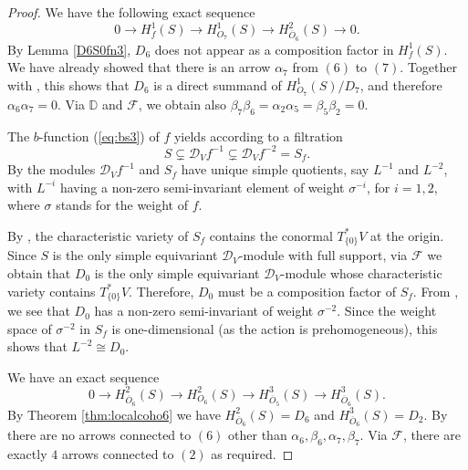 \documentclass[11pt,reqno]{amsart}
\renewcommand{\a}{\alpha}
\renewcommand{\b}{\beta}
\newcommand{\D}{\mathcal{D}}
\newcommand{\mc}[1]{\mathcal{#1}}
\newcommand{\ol}[1]{\overline{#1}}
\numberwithin{equation}{section}
\begin{document}
\begin{proof}
We have the following exact sequence
\begin{equation}\label{eq:O7}
0 \to H^1_f(S) \to H^1_{O_7}(S) \to H^2_{\ol{O}_6}(S) \to 0.
\end{equation}
By Lemma \ref{D6S0fn3}, $D_6$ does not appear as a composition factor in $H^1_f(S)$. We have already showed that there is an arrow $\a_7$ from $(6)$ to $(7)$. Together with \cite[Lemma 3.11]{lHorincz2019categories}, this shows that $D_6$ is a direct summand of $H^1_{O_7}(S)/D_7$, and therefore $\a_6 \a_7 = 0$. Via $\mathbb{D}$ and $\mc{F}$, we obtain also $\b_7 \b_6 = \a_2 \a_5 = \b_5 \b_2=0$.

The $b$-function (\ref{eq:bs3}) of $f$ yields according to \cite[Proposition 4.9]{lHorincz2019categories} a filtration
\[S \subsetneq \D_V f^{-1} \subsetneq \D_V f^{-2} = S_f.\]
By \cite[Lemma 2.8]{lHorincz2019categories} the modules $\D_V f^{-1}$ and $S_f$ have unique simple quotients, say $L^{-1}$ and $L^{-2}$, with $L^{-i}$ having a non-zero semi-invariant element of weight $\sigma^{-i}$, for $i=1,2$, where $\sigma$ stands for the weight of $f$. 

By \cite[Proposition 4.6]{microlocal}, the characteristic variety of $S_f$ contains the conormal $T_{\{0\}}^* V$ at the origin. Since $S$ is the only simple equivariant $\D_V$-module with full support, via $\mc{F}$ we obtain that $D_0$ is the only simple equivariant $\D_V$-module whose characteristic variety contains $T_{\{0\}}^* V$. Therefore, $D_0$ must be a composition factor of $S_f$. From \cite[Equation 4.14]{lHorincz2019categories}, we see that $D_0$ has a non-zero semi-invariant of weight $\sigma^{-2}$. Since the weight space of $\sigma^{-2}$ in $S_f$ is one-dimensional (as the action is prehomogeneous), this shows that $L^{-2} \cong D_0$.

We have an exact sequence
\begin{equation}\label{eq:O6}
0 \to H^2_{\ol{O}_6}(S) \to H^2_{O_6}(S) \to H^3_{\ol{O}_5}(S) \to H^3_{\ol{O}_6}(S).
\end{equation}
By Theorem \ref{thm:localcoho6} we have $H^2_{\ol{O}_6}(S)=D_6$ and $H^3_{\ol{O}_6}(S)=D_2$. By \cite[Lemma 3.11]{lHorincz2019categories} there are no arrows connected to $(6)$ other than $\a_6, \b_6, \a_7, \b_7$. Via $\mc{F}$, there are exactly $4$ arrows connected to $(2)$ as required. 


\end{proof}
\end{document}
